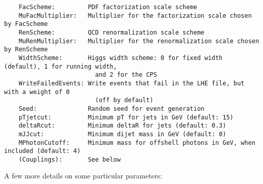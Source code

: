 \documentclass[aps,superscriptaddress,nofootinbib]{revtex4}
\begin{document}
\begin{verbatim}
    FacScheme:         PDF factorization scale scheme
    MuFacMultiplier:   Multiplier for the factorization scale chosen by FacScheme
    RenScheme:         QCD renormalization scale scheme
    MuRenMultiplier:   Multiplier for the renormalization scale chosen by RenScheme
    WidthScheme:       Higgs width scheme: 0 for fixed width (default), 1 for running width,
                         and 2 for the CPS
    WriteFailedEvents: Write events that fail in the LHE file, but with a weight of 0
                         (off by default)
    Seed:              Random seed for event generation
    pTjetcut:          Minimum pT for jets in GeV (default: 15)
    deltaRcut:         Minimum deltaR for jets (default: 0.3)
    mJJcut:            Minimum dijet mass in GeV (default: 0)
    MPhotonCutoff:     Minimum mass for offshell photons in GeV, when included (default: 4)
    (Couplings):       See below
\end{verbatim}

\noindent
A few more details on some particular parameters:
\end{document}
